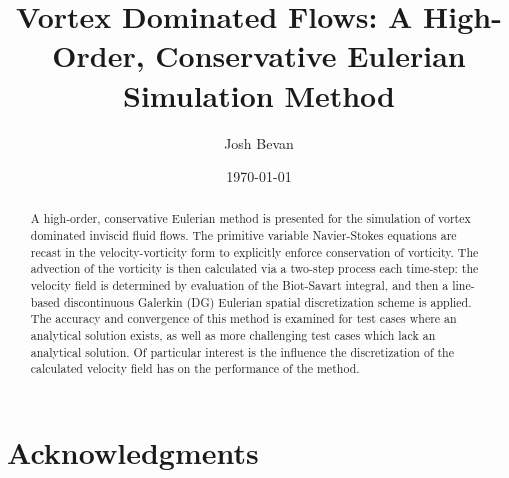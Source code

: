 \documentclass[letterpaper,12pt]{report}
\title{Vortex Dominated Flows: A High-Order, Conservative Eulerian Simulation Method}
\author{Josh Bevan}
\date{\today}
\begin{document}
\maketitle
\begin{abstract}
\setcounter{page}{2} %
\thispagestyle{plain} %
A high-order, conservative Eulerian method is presented for the simulation of vortex dominated inviscid fluid flows. The primitive variable Navier-Stokes equations are recast in the velocity-vorticity form to explicitly enforce conservation of vorticity. The advection of the vorticity is then calculated via a two-step process each time-step: the velocity field is determined by evaluation of the Biot-Savart integral, and then a line-based discontinuous Galerkin (DG) Eulerian spatial discretization scheme is applied. The accuracy and convergence of this method is examined for test cases where an analytical solution exists, as well as more challenging test cases which lack an analytical solution. Of particular interest is the influence the discretization of the calculated velocity field has on the performance of the method.
\end{abstract}

\setcounter{page}{3} %
\chapter*{Acknowledgments}
\begin{singlespace} %
\tableofcontents
\listoftables
{}
\listoffigures
{}
\end{singlespace}

\pagestyle{myheadings}
\makeatletter
\renewcommand\chapter{\if@openright\cleardoublepage\else\clearpage\fi
                    \thispagestyle{myheadings}%
                    \global\@topnum\z@
                    \@afterindentfalse
                    \secdef\@chapter\@schapter}
\makeatother
\end{document}
